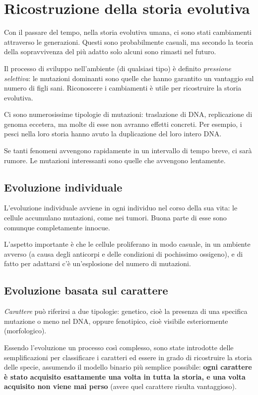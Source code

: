 \newpage
\section{Ricostruzione della storia evolutiva}
Con il passare del tempo, nella storia evolutiva umana, ci sono stati cambiamenti attraverso le generazioni. Questi sono probabilmente casuali, ma secondo la teoria della sopravvivenza del più adatto solo alcuni sono rimasti nel futuro.

Il processo di sviluppo nell'ambiente (di qualsiasi tipo) è definito \textit{pressione selettiva}: le mutazioni dominanti sono quelle che hanno garantito un vantaggio sul numero di figli sani. Riconoscere i cambiamenti è utile per ricostruire la storia evolutiva.

Ci sono numerosissime tipologie di mutazioni: traslazione di DNA, replicazione di genoma eccetera, ma molte di esse non avranno effetti concreti. Per esempio, i pesci nella loro storia hanno avuto la duplicazione del loro intero DNA.

Se tanti fenomeni avvengono rapidamente in un intervallo di tempo breve, ci sarà rumore. Le mutazioni interessanti sono quelle che avvengono lentamente.

\subsection{Evoluzione individuale}
L'evoluzione individuale avviene in ogni individuo nel corso della sua vita: le cellule accumulano mutazioni, come nei tumori. Buona parte di esse sono comunque completamente innocue.

L'aspetto importante è che le cellule proliferano in modo casuale, in un ambiente avverso (a causa degli anticorpi e delle condizioni di pochissimo ossigeno), e di fatto per adattarsi c'è un'esplosione del numero di mutazioni. 

\subsection{Evoluzione basata sul carattere}
\textit{Carattere} può riferirsi a due tipologie: genetico, cioè la presenza di una specifica mutazione o meno nel DNA, oppure fenotipico, cioè visibile esteriormente (morfologico).

Essendo l'evoluzione un processo così complesso, sono state introdotte delle semplificazioni per classificare i caratteri ed essere in grado di ricostruire la storia delle specie, assumendo il modello binario più semplice possibile: \textbf{ogni carattere è stato acquisito esattamente una volta in tutta la storia, e una volta acquisito non viene mai perso} (avere quel carattere risulta vantaggioso).

